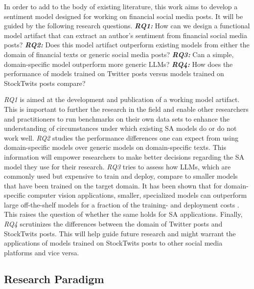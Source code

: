 In order to add to the body of existing literature, this work aims to develop a sentiment model designed for working on financial social media posts. It will be guided by the following research questions.\newline
\textbf{\emph{RQ1:}} How can we design a functional model artifact that can extract an author's sentiment from financial social media posts?\newline
\textbf{\emph{RQ2:}} Does this model artifact outperform existing models from either the domain of financial texts or generic social media posts?\newline
\textbf{\emph{RQ3:}} Can a simple, domain-specific model outperform more generic LLMs?\newline
\textbf{\emph{RQ4:}} How does the performance of models trained on Twitter posts versus models trained on StockTwits posts compare?

\emph{RQ1} is aimed at the development and publication of a working model artifact. This is important to further the research in the field and enable other researchers and practitioners to run benchmarks on their own data sets to enhance the understanding of circumstances under which existing SA models do or do not work well. \emph{RQ2} studies the performance differences one can expect from using domain-specific models over generic models on domain-specific texts. This information will empower researchers to make better decisions regarding the SA model they use for their research. \emph{RQ3} tries to assess how LLMs, which are commonly used but expensive to train and deploy, compare to smaller models that have been trained on the target domain. It has been shown that for domain-specific computer vision applications, smaller, specialized models can outperform large off-the-shelf models for a fraction of the training- and deployment costs . This raises the question of whether the same holds for SA applications. Finally, \emph{RQ4} scrutinizes the differences between the domain of Twitter posts and StockTwits posts. This will help guide future research and might warrant the applications of models trained on StockTwits posts to other social media platforms and vice versa.


\subsection{Research Paradigm}

